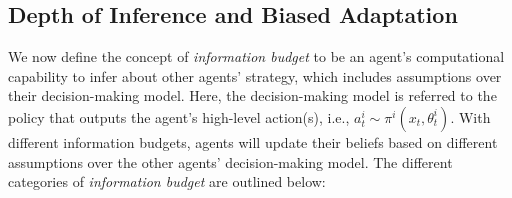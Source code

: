 \documentclass[letterpaper, 10 pt, conference]{ieeeconf}  %
\begin{document}
\subsection{Depth of Inference and Biased Adaptation}
We now define the concept of \textit{information budget} to be an agent's 
computational capability to infer about other agents' strategy, 
which includes assumptions over their decision-making model. Here, the 
decision-making model is referred to the policy that outputs 
the agent's high-level action(s), i.e., 
$a^i_{t} \sim \pi^i(x_t,\theta^i_t)$. With different information budgets, 
agents will update their beliefs based on different assumptions over the 
other agents' decision-making model. The different categories of \textit{information budget} are outlined below:
\end{document}
